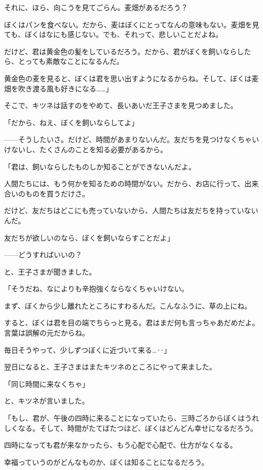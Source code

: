 それに、ほら、向こうを見てごらん。麦畑があるだろう？

ぼくはパンを食べない。だから、麦はぼくにとってなんの意味もない。麦畑を見ても、ぼくはなにも感じない。でも、それって、悲しいことだよね。

だけど、君は黄金色の髪をしているだろう。だから、君がぼくを飼いならしたら、とっても素敵なことになるんだ。

黄金色の麦を見ると、ぼくは君を思い出すようになるからね。そして、ぼくは麦畑を吹き渡る風も好きになる……」

そこで、キツネは話すのをやめて、長いあいだ王子さまを見つめました。

「だから、ねえ、ぼくを飼いならしてよ」

——そうしたいさ。だけど、時間があまりないんだ。友だちを見つけなくちゃいけないし、たくさんのことを知る必要があるから。

「君は、飼いならしたものしか知ることができないんだよ。

人間たちには、もう何かを知るための時間がない。だから、お店に行って、出来合いのものを買うだけさ。

だけど、友だちはどこにも売っていないから、人間たちは友だちを持っていないんだ。

友だちが欲しいのなら、ぼくを飼いならすことだよ」


——どうすればいいの？

と、王子さまが聞きました。

「そうだね、なによりも辛抱強くならなくちゃいけない。

まず、ぼくから少し離れたところにすわるんだ。こんなふうに、草の上にね。

すると、ぼくは君を目の端でちらっと見る。君はまだ何も言っちゃあだめだよ。言葉は誤解の元だからね。

毎日そうやって、少しずつぼくに近づいて来る…‥」

翌日になると、王子さまはまたキツネのところにやって来ました。

「同じ時間に来なくちゃ」

と、キツネが言いました。

「もし、君が、午後の四時に来ることになっていたら、三時ごろからぼくはうれしくなる。そして、時間がたてばたつほど、ぼくはどんどん幸せになるだろう。

四時になっても君が来なかったら、もう心配で心配で、仕方がなくなる。

幸福っていうのがどんなものか、ぼくは知ることになるだろう。

